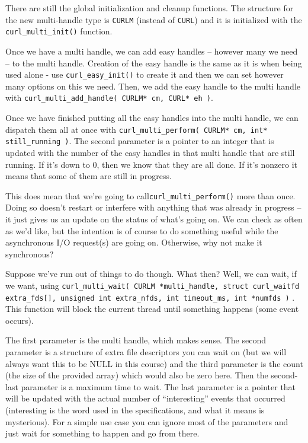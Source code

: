 \documentclass[a4paper]{report}
\begin{document}
There are still the global initialization and cleanup functions. The structure for the new multi-handle type is \texttt{CURLM} (instead of \texttt{CURL}) and it is initialized with the \texttt{curl\_multi\_init()} function.

Once we have a multi handle, we can add easy handles -- however many we need -- to the multi handle. Creation of the easy handle is the same as it is when being used alone - use \texttt{curl\_easy\_init()} to create it and then we can set however many options on this we need. Then, we add the easy handle to the multi handle with \texttt{curl\_multi\_add\_handle( CURLM* cm, CURL* eh )}.

Once we have finished putting all the easy handles into the multi handle, we can dispatch them all at once with \texttt{curl\_multi\_perform( CURLM* cm, int* still\_running )}. The second parameter is a pointer to an integer that is updated with the number of the easy handles in that multi handle that are still running. If it's down to 0, then we know that they are all done. If it's nonzero it means that some of them are still in progress.

This does mean that we're going to call\texttt{curl\_multi\_perform()} more than once. Doing so doesn't restart or interfere with anything that was already in progress -- it just gives us an update on the status of what's going on. We can check as often as we'd like, but the intention is of course to do something useful while the asynchronous I/O request(s) are going on. Otherwise, why not make it synchronous?

Suppose we've run out of things to do though. What then? Well, we can wait, if we want, using \texttt{curl\_multi\_wait( CURLM *multi\_handle, struct curl\_waitfd extra\_fds[], unsigned int extra\_nfds, int timeout\_ms, int *numfds )} . This function will block the current thread until something happens (some event occurs).

The first parameter is the multi handle, which makes sense. The second parameter is a structure of extra file descriptors you can wait on (but we will always want this to be NULL in this course) and the third parameter is the count (the size of the provided array) which would also be zero here. Then the second-last parameter is a maximum time to wait. The last parameter is a pointer that will be updated with the actual number of ``interesting'' events that occurred (interesting is the word used in the specifications, and what it means is mysterious). For a simple use case you can ignore most of the parameters and just wait for something to happen and go from there.
\end{document}
